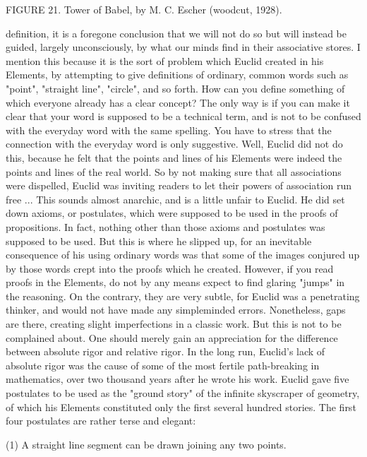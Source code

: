 FIGURE 21. Tower of Babel, by M. C. Escher (woodcut, 1928). 







definition, it is a foregone conclusion that we will not do so but will instead be guided, largely unconsciously, by what our minds find in their associative stores. I mention this because it is the sort of problem which Euclid created in his Elements, by attempting to give definitions of ordinary, common words such as "point", "straight line", "circle", and so forth. How can you define something of which everyone already has a clear concept? The only way is if you can make it clear that your word is supposed to be a technical term, and is not to be confused with the everyday word with the same spelling. You have to stress that the connection with the everyday word is only suggestive. Well, Euclid did not do this, because he felt that the points and lines of his Elements were indeed the points and lines of the real world. So by not making sure that all associations were dispelled, Euclid was inviting readers to let their powers of association run free ... This sounds almost anarchic, and is a little unfair to Euclid. He did set down axioms, or postulates, which were supposed to be used in the proofs of propositions. In fact, nothing other than those axioms and postulates was supposed to be used. But this is where he slipped up, for an inevitable consequence of his using ordinary words was that some of the images conjured up by those words crept into the proofs which he created. However, if you read proofs in the Elements, do not by any means expect to find glaring "jumps" in the reasoning. On the contrary, they are very subtle, for Euclid was a penetrating thinker, and would not have made any simpleminded errors. Nonetheless, gaps are there, creating slight imperfections in a classic work. But this is not to be complained about. One should merely gain an appreciation for the difference between absolute rigor and relative rigor. In the long run, Euclid's lack of absolute rigor was the cause of some of the most fertile path-breaking in mathematics, over two thousand years after he wrote his work. Euclid gave five postulates to be used as the "ground story" of the infinite skyscraper of geometry, of which his Elements constituted only the first several hundred stories. The first four postulates are rather terse and elegant: 

(1) A straight line segment can be drawn joining any two points. 

